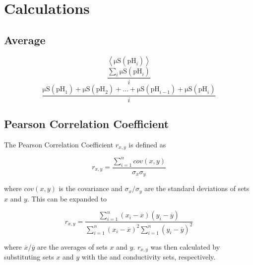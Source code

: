 \documentclass[a4paper]{article}
\def\mean#1{\left< #1 \right>}
\newcommand{\pH}{\text{pH}}
\begin{document}
    \section{Calculations}
        \subsection{Average}
            \begin{equation}
                \mean{\si{\micro\siemens}(\pH_i)}
            \end{equation}
            \begin{equation}
                \frac{\displaystyle\sum_i{\si{\micro\siemens}(\pH_i)}}{i}
            \end{equation}
            \begin{equation}
                \frac{\si{\micro\siemens}(\pH_1)+\si{\micro\siemens}(\pH_2)+...+\si{\micro\siemens}(\pH_{i-1})+\si{\micro\siemens}(\pH_i)}{i}
            \end{equation}
        \subsection{Pearson Correlation Coefficient}
            \centerline{The Pearson Correlation Coefficient $r_{x,y}$ is defined as}
            \begin{equation}
                r_{x,y}=\frac{\displaystyle\sum_{i=1}^n{cov(x,y)}}{\sigma_x\sigma_y}
            \end{equation}
            \begin{center}
                where $cov(x,y)$ is the covariance and $\sigma_x/\sigma_y$ are
                the standard deviations of sets $x$ and $y$. This can be expanded
                to
            \end{center}
            \begin{equation}
                r_{x,y}=\frac{\displaystyle\sum_{i=1}^n{(x_i-\overline{x})(y_i-\overline{y})}}{\displaystyle\sum_{i=1}^n{(x_i-\overline{x})^2}\displaystyle\sum_{i=1}^n{(y_i-\overline{y})^2}}
            \end{equation}
            \begin{center}
                where $\overline{x}/\overline{y}$ are the averages of sets $x$ and $y$.
                $r_{x,y}$ was then calculated by substituting sets $x$ and $y$ with the
                \pH{} and conductivity sets, respectively.
            \end{center}
\end{document}

